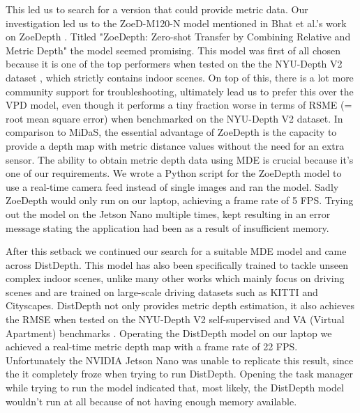 \documentclass{article}[a4paper]
\begin{document}
This led us to search for a version that could provide metric data. Our investigation led us to the ZoeD-M120-N model mentioned in Bhat et al.'s work on ZoeDepth \cite{bhat2023zoedepth}. Titled "ZoeDepth: Zero-shot Transfer by Combining Relative and Metric Depth" \cite{ranking-MDE} the model seemed promising. This model was first of all chosen because it is one of the top performers when tested on the the NYU-Depth V2 dataset \cite{NYU-DepthV2}, which strictly contains indoor scenes. On top of this, there is a lot more community support for troubleshooting, ultimately lead us to prefer this over the VPD \cite{zhao2023unleashing} model, even though it performs a tiny fraction worse in terms of RSME (= root mean square error) when benchmarked on the NYU-Depth V2 dataset. In comparison to MiDaS, the essential advantage of ZoeDepth is the capacity to provide a depth map with metric distance values without the need for an extra sensor. The ability to obtain metric depth data using MDE is crucial because it’s one of our requirements. We wrote a Python script for the ZoeDepth model to use a real-time camera feed instead of single images and ran the model. Sadly ZoeDepth would only run on our laptop, achieving a frame rate of 5 FPS. Trying out the model on the Jetson Nano multiple times, kept resulting in an error message stating the application had been  as a result of insufficient memory.
\newline

After this setback we continued our search for a suitable MDE model and came across DistDepth\cite{wu2022toward}. This model has also been specifically trained to tackle unseen complex indoor scenes, unlike many other works which mainly focus on driving scenes and are trained on large-scale driving datasets such as KITTI\cite{geiger2013vision} and Cityscapes\cite{cordts2015cityscapes}. DistDepth not only provides metric depth estimation, it also achieves the RMSE when tested on the NYU-Depth V2 self-supervised and VA (Virtual Apartment) benchmarks \cite{MDE}. Operating the DistDepth model on our laptop we achieved a real-time metric depth map with a frame rate of 22 FPS. Unfortunately the NVIDIA Jetson Nano was unable to replicate this result, since the it completely froze when trying to run DistDepth. Opening the task manager while trying to run the model indicated that, most likely, the DistDepth model wouldn't run at all because of not having enough memory available.
\end{document}

